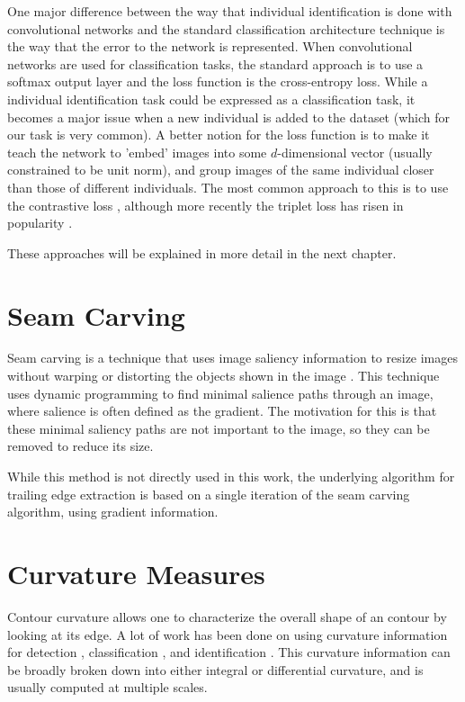 One major difference between the way that individual identification is done with convolutional networks and the standard classification architecture technique is the way that the error to the network is represented.
When convolutional networks are used for classification tasks, the standard approach is to use a softmax output layer and the loss function is the cross-entropy loss.
While a individual identification task could be expressed as a classification task, it becomes a major issue when a new individual is added to the dataset (which for our task is very common).
A better notion for the loss function is to make it teach the network to 'embed' images into some $d$-dimensional vector (usually constrained to be unit norm), and group images of the same individual closer than those of different individuals.
The most common approach to this is to use the contrastive loss \cite{fan2014learning} \cite{chopra2005learning}, although more recently the triplet loss has risen in popularity \cite{schroff2015facenet} \cite{parkhi2015deep}.

These approaches will be explained in more detail in the next chapter.

\section{Seam Carving}

Seam carving is a technique that uses image saliency information to resize images without warping or distorting the objects shown in the image \cite{Avidan:2007:SCC:1276377.1276390}.
This technique uses dynamic programming to find minimal salience paths through an image, where salience is often defined as the gradient.
The motivation for this is that these minimal saliency paths are not important to the image, so they can be removed to reduce its size.

While this method is not directly used in this work, the underlying algorithm for trailing edge extraction is based on a single iteration of the seam carving algorithm, using gradient information.

\section{Curvature Measures}

Contour curvature allows one to characterize the overall shape of an contour by looking at its edge.
A lot of work has been done on using curvature information for detection \cite{monroy2011beyond}, classification \cite{fischer2014image}, and identification \cite{kumar2012leafsnap}.
This curvature information can be broadly broken down into either integral or differential curvature, and is usually computed at multiple scales.

